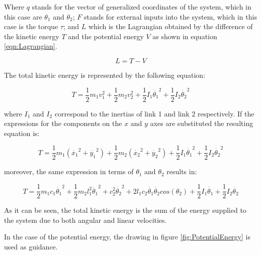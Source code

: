 \documentclass[main.tex]{subfiles}
\begin{document}
Where $q$  stands for the vector of generalized coordinates of the system, which in this case are $\theta_1$ and $\theta_2$; $F$ stands for external inputs into the system, which in this case is the torque $\tau$; and $L$  which is the Lagrangian obtained by the difference of the kinetic energy $T$ and the potential energy $V$ as shown in equation \ref{eqn:Lagrangian}.

\begin{equation}\label{eqn:Lagrangian} 
L=T-V
\end{equation}

The total kinetic energy is represented by the following equation:

\begin{equation}
T= \frac{1}{2}  m_1 v_1^2 +
    \frac{1}{2} m_2 v_2^2 +
    \frac{1}{2} I_1 \dot{\theta_1}^2 +
    \frac{1}{2} I_2 \dot{\theta_2}^2
\end{equation}

where $I_1$ and $I_2$ correspond to the inertias of link 1 and link 2 respectively. If the expressions for the components on the $x$ and $y$ axes are substituted the resulting equation is:

\begin{equation}
T= \frac{1}{2}  m_1 (\dot{x_1}^2 + \dot{y_1}^2) +
    \frac{1}{2} m_2 (\dot{x_2}^2 + \dot{y_2}^2) +
    \frac{1}{2} I_1 \dot{\theta_1}^2 +
    \frac{1}{2} I_2 \dot{\theta_2}^2
\end{equation}


moreover, the same expression in terms of $\theta_1$ and $\theta_2$ results in:

\begin{equation}
	T= \frac{1}{2}m_1 c_1 \dot{\theta_1}^2 +
    	\frac{1}{2}m_2 l_1^2\dot{\theta_1}^2+c_2^2\dot{\theta_2}^2 + 
        2l_1c_2\dot{\theta_1}\dot{\theta_2}cos(\theta_2) + 
        \frac{1}{2}I_1\dot{\theta_1} + 
        \frac{1}{2}I_2\dot{\theta_2}
\end{equation}


As it can be seen, the total kinetic energy is the sum of the energy supplied to the system due to both angular and linear velocities.

In the case of the potential energy, the drawing in figure \ref{fig:PotentialEnergy} is used as guidance.
\end{document}
